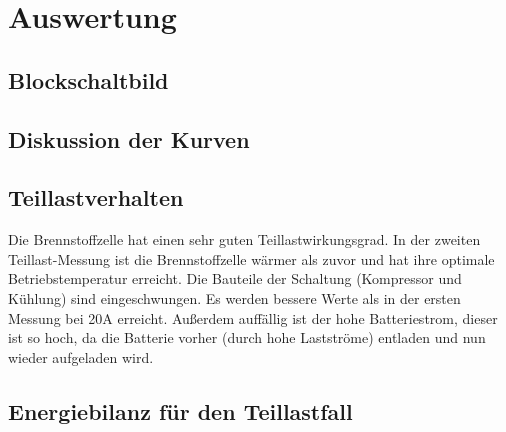 \section{Auswertung}
\label{sec:Auswertung}


\subsection{Blockschaltbild}
\subsection{}
\subsection{}
\subsection{Diskussion der Kurven}
\subsection{}
\subsection{Teillastverhalten}

Die Brennstoffzelle hat einen sehr guten Teillastwirkungsgrad. In der zweiten Teillast-Messung ist die Brennstoffzelle wärmer als zuvor und hat ihre optimale Betriebstemperatur erreicht. Die Bauteile der Schaltung (Kompressor und Kühlung) sind eingeschwungen. Es werden bessere Werte als in der ersten Messung bei 20A erreicht. Außerdem auffällig ist der hohe Batteriestrom, dieser ist so hoch, da die Batterie vorher (durch hohe Lastströme) entladen und nun wieder aufgeladen wird. 



\subsection{Energiebilanz für den Teillastfall}